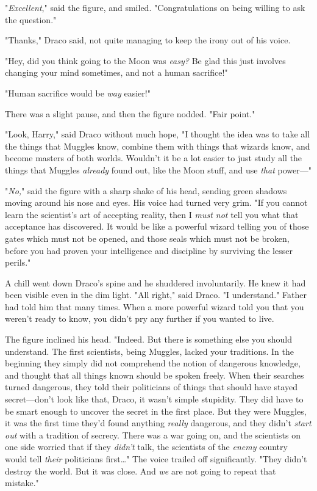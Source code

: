 "\emph{Excellent}," said the figure, and smiled. "Congratulations on being 
willing to ask the question."

"Thanks," Draco said, not quite managing to keep the irony out of his voice.

"Hey, did you think going to the Moon was \emph{easy?} Be glad this just 
involves changing your mind sometimes, and not a human sacrifice!"

"Human sacrifice would be \emph{way} easier!"

There was a slight pause, and then the figure nodded. "Fair point."

"Look, Harry," said Draco without much hope, "I thought the idea was to take 
all the things that Muggles know, combine them with things that wizards know, 
and become masters of both worlds. Wouldn't it be a lot easier to just study 
all the things that Muggles \emph{already} found out, like the Moon stuff, and 
use \emph{that} power---"

"\emph{No,}" said the figure with a sharp shake of his head, sending green 
shadows moving around his nose and eyes. His voice had turned very grim. "If 
you cannot learn the scientist's art of accepting reality, then I \emph{must 
not} tell you what that acceptance has discovered. It would be like a powerful 
wizard telling you of those gates which must not be opened, and those seals 
which must not be broken, before you had proven your intelligence and 
discipline by surviving the lesser perils."

A chill went down Draco's spine and he shuddered involuntarily. He knew it had 
been visible even in the dim light. "All right," said Draco. "I understand." 
Father had told him that many times. When a more powerful wizard told you that 
you weren't ready to know, you didn't pry any further if you wanted to live.

The figure inclined his head. "Indeed. But there is something else you should 
understand. The first scientists, being Muggles, lacked your traditions. In the 
beginning they simply did not comprehend the notion of dangerous knowledge, and 
thought that all things known should be spoken freely. When their searches 
turned dangerous, they told their politicians of things that should have stayed 
secret---don't look like that, Draco, it wasn't simple stupidity. They did have 
to be smart enough to uncover the secret in the first place. But they were 
Muggles, it was the first time they'd found anything \emph{really} dangerous, 
and they didn't \emph{start out} with a tradition of secrecy. There was a war 
going on, and the scientists on one side worried that if they \emph{didn't} 
talk, the scientists of the \emph{enemy} country would tell \emph{their} 
politicians first{\ldots}" The voice trailed off significantly. "They didn't 
destroy the world. But it was close. And \emph{we} are not going to repeat that 
mistake."

